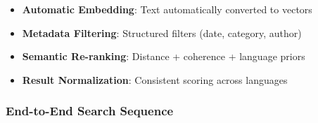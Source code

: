 \begin{itemize}[noitemsep]
    \item \textbf{Automatic Embedding}: Text automatically converted to vectors
    \item \textbf{Metadata Filtering}: Structured filters (date, category, author)
    \item \textbf{Semantic Re-ranking}: Distance + coherence + language priors
    \item \textbf{Result Normalization}: Consistent scoring across languages
\end{itemize}

\subsubsection{End-to-End Search Sequence}

